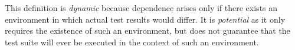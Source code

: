 This definition is \emph{dynamic} because dependence arises only
if there exists an environment in which actual test results would differ.
It is \emph{potential} as it only requires the existence of such an
environment, but does not
guarantee that the test suite will ever be executed in the context
of such an environment.


%
%
%
%
%
%
%
%
%
